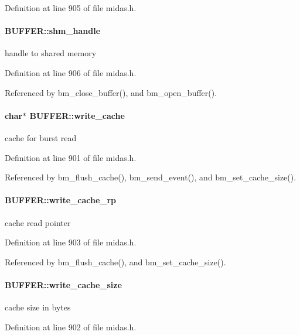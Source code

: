 Definition at line 905 of file midas.h.
\paragraph[{shm\_\-handle}]{ {\bf BUFFER::shm\_\-handle}}\hfill\label{structBUFFER_ae313313f5d3caa148ea750395c88a54f}
handle to shared memory 

Definition at line 906 of file midas.h.

Referenced by bm\_\-close\_\-buffer(), and bm\_\-open\_\-buffer().
\paragraph[{write\_\-cache}]{\setlength{\rightskip}{0pt plus 5cm}char$\ast$ {\bf BUFFER::write\_\-cache}}\hfill\label{structBUFFER_a99f8e53c723d75ba23267ae71309c6e7}
cache for burst read 

Definition at line 901 of file midas.h.

Referenced by bm\_\-flush\_\-cache(), bm\_\-send\_\-event(), and bm\_\-set\_\-cache\_\-size().
\paragraph[{write\_\-cache\_\-rp}]{ {\bf BUFFER::write\_\-cache\_\-rp}}\hfill\label{structBUFFER_a70b3193c3c9315051f94e478bba3ae58}
cache read pointer 

Definition at line 903 of file midas.h.

Referenced by bm\_\-flush\_\-cache(), and bm\_\-set\_\-cache\_\-size().
\paragraph[{write\_\-cache\_\-size}]{ {\bf BUFFER::write\_\-cache\_\-size}}\hfill\label{structBUFFER_a88f5da13720c678e5d2facd5a61e15be}
cache size in bytes 

Definition at line 902 of file midas.h.

